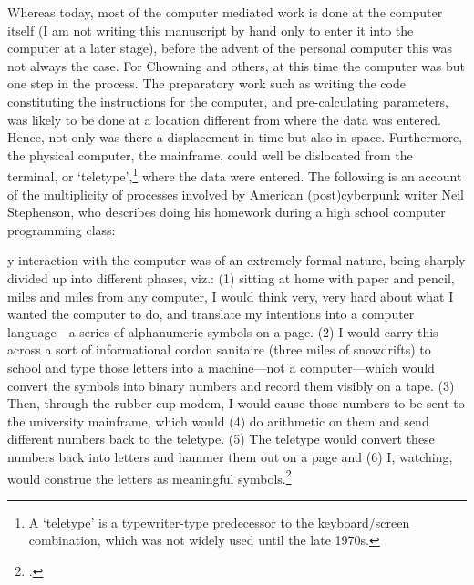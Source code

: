 \label{sec:interaction-time:3}
Whereas today, most of the computer mediated work is done at the computer itself (I am not writing this manuscript by hand only to enter it into the computer at a later stage), before the advent of the personal computer this was not always the case. For Chowning and others, at this time the computer was but one step in the process. The preparatory work such as writing the code constituting the instructions for the computer, and pre-calculating parameters, was likely to be done at a location different from where the data was entered. Hence, not only was there a displacement in time but also in space. Furthermore, the physical computer, the mainframe, could well be dislocated from the terminal, or `teletype',\footnote{A `teletype' is a typewriter-type predecessor to the keyboard/screen combination, which was not widely used until the late 1970s.} where the data were entered. The following is an account of the multiplicity of processes involved by American (post)cyberpunk writer Neil Stephenson, who describes doing his homework during a high school computer programming class:
%
\begin{squote}
[M]y interaction with the computer was of an extremely formal nature, being sharply divided up into different phases, viz.: (1) sitting at home with paper and pencil, miles and miles from any computer, I would think very, very hard about what I wanted the computer to do, and translate my intentions into a computer language---a series of alphanumeric symbols on a page. (2) I would carry this across a sort of informational cordon sanitaire (three miles of snowdrifts) to school and type those letters into a machine---not a computer---which would convert the symbols into binary numbers and record them visibly on a tape. (3) Then, through the rubber-cup modem, I would cause those numbers to be sent to the university mainframe, which would (4) do arithmetic on them and send different numbers back to the teletype. (5) The teletype would convert these numbers back into letters and hammer them out on a page and (6) I, watching, would construe the letters as meaningful symbols.\footcite[chap. `Bit-Flinger', \S~4]{stephenson99}
\end{squote}
%
